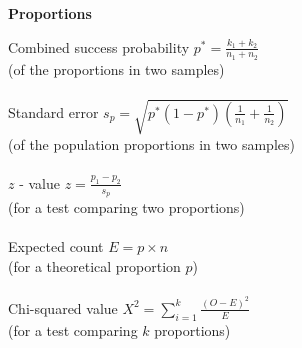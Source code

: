 \hfill\vline\hfill
\begin{minipage}[t]{.45\textwidth}
\begin{center}
    \textbf{Proportions}
\end{center}
\hline
\answerskip
Combined success probability \hfill $p^* = \frac{k_1 + k_2}{n_1 + n_2}$ \\
{\scriptsize (of the proportions in two samples)} \\
\\
Standard error \hfill $s_p = \sqrt{p^*(1 - p^*) (\frac{1}{n_1} + \frac{1}{n_2})}$ \\
{\scriptsize (of the population proportions in two samples)} \\
\\
$z$ - value \hfill $z = \frac{p_1 - p_2}{s_p}$ \\
{\scriptsize (for a test comparing two proportions)} \\
\\
Expected count \hfill $E = p \times n$ \\
{\scriptsize (for a theoretical proportion $p$)} \\
\\
Chi-squared value \hfill $X^2 = \sum_{i=1}^k \frac{(O - E)^2}{E}$ \\
{\scriptsize (for a test comparing $k$ proportions)} \\
\\
\end{minipage}

\clearpage %